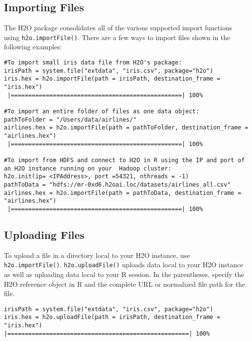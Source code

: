 {{\subsection{Importing Files}

The H2O package consolidates all of the various supported import functions using {\texttt{h2o.importFile()}}. %
There are a few ways to import files shown in the following examples: 

\begin{lstlisting}[style=R]
#To import small iris data file from H2O's package:
irisPath = system.file("extdata", "iris.csv", package="h2o")
iris.hex = h2o.importFile(path = irisPath, destination_frame = "iris.hex")
 |=================================================| 100%

#To import an entire folder of files as one data object:
pathToFolder = "/Users/data/airlines/"
airlines.hex = h2o.importFile(path = pathToFolder, destination_frame = "airlines.hex")
 |=================================================| 100%

#To import from HDFS and connect to H2O in R using the IP and port of an H2O instance running on your  Hadoop cluster:
h2o.init(ip= <IPAddress>, port =54321, nthreads = -1)
pathToData = "hdfs://mr-0xd6.h2oai.loc/datasets/airlines_all.csv"
airlines.hex = h2o.importFile(path = pathToData, destination_frame = "airlines.hex")
 |=================================================| 100%

\end{lstlisting}
\subsection{Uploading Files}

To upload a file in a directory local to your H2O instance, use {\texttt{h2o.importFile()}}.  {\texttt{h2o.uploadFile()}}  uploads data local to your H2O instance as well as uploading data local to your R session. In the parentheses, specify the H2O reference object in R and the complete URL or normalized file path for the file.

\begin{lstlisting}[style=R]
irisPath = system.file("extdata", "iris.csv", package="h2o")
iris.hex = h2o.uploadFile(path = irisPath, destination_frame = "iris.hex")
|====================================================| 100% 
\end{lstlisting}


}}
